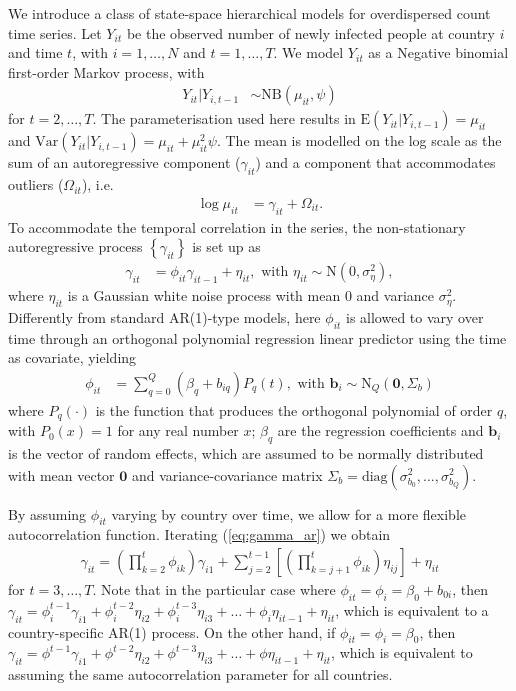 \documentclass[fleqn,10pt]{wlscirep}
\begin{document}
We introduce a class of state-space hierarchical models for overdispersed count time series. Let $Y_{it}$ be the observed number of newly infected people at country $i$ and time $t$, with $i=1,\ldots,N$ and $t=1,\ldots,T$. We model $Y_{it}$ as a Negative binomial first-order Markov process, with
\begin{align*}
    Y_{it}|Y_{i,t-1} &\sim \mbox{NB}(\mu_{it},\psi)
\end{align*}
for $t=2,\ldots,T$. The parameterisation used here results in $\mbox{E}(Y_{it}|Y_{i,t-1})=\mu_{it}$ and $\mbox{Var}(Y_{it}|Y_{i,t-1})=\mu_{it}+\mu_{it}^2\psi$. The mean is modelled on the log scale as the sum of an autoregressive component ($\gamma_{it}$) and a component that accommodates outliers ($\Omega_{it}$), i.e.
\begin{align*}
    \log\mu_{it} &= \gamma_{it}+\Omega_{it}.
\end{align*}
To accommodate the temporal correlation in the series, the non-stationary autoregressive process $\left\lbrace \gamma_{it} \right\rbrace$ is set up as 
\begin{align}
    \gamma_{it} &= \phi_{it}\gamma_{it-1} + \eta_{it}, \mbox{ with } \eta_{it} \sim \mathrm{N}\left(0,\sigma^2_{\eta}\right),
    \label{eq:gamma_ar}
\end{align}
where $\eta_{it}$ is a Gaussian white noise process with mean $0$ and variance $\sigma_{\eta}^2$. Differently from standard AR(1)-type models, here $\phi_{it}$ is allowed to vary over time through an orthogonal polynomial regression linear predictor using the time as covariate, yielding
\begin{align}
    \phi_{it} &= \displaystyle \sum_{q=0}^{Q} (\beta_{q}+b_{iq})P_{q}(t), \mbox{ with } \bm{b}_{i} \sim \mathrm{N}_Q\left(\mathbf{0}, \Sigma_b\right)
    \label{eq:phi}
\end{align}
where $P_q(\cdot)$ is the function that produces the orthogonal polynomial of order $q$, with $P_0(x)=1$ for any real number $x$; $\beta_q$ are the regression coefficients and $\bm{b}_{i}$ is the vector of random effects, which are assumed to be normally distributed with mean vector $\mathbf{0}$ and variance-covariance matrix $\Sigma_b=\mathrm{diag}\left({\sigma^2_{b_0},\ldots,\sigma^2_{b_Q}}\right)$.

By assuming $\phi_{it}$ varying by country over time, we allow for a more flexible autocorrelation function. Iterating (\ref{eq:gamma_ar}) we obtain
\begin{align*}
    \displaystyle\gamma_{it} = \left(\prod_{k=2}^t\phi_{ik}\right)\gamma_{i1}+\sum_{j=2}^{t-1}\left[\left(\prod_{k=j+1}^t\phi_{ik}\right)\eta_{ij}\right]+\eta_{it}
\end{align*}
for $t = 3,\ldots,T$. Note that in the particular case where $\phi_{it}=\phi_{i}=\beta_{0}+b_{0i}$, then $\gamma_{it}= \phi_{i}^{t-1}\gamma_{i1}+\phi_{i}^{t-2}\eta_{i2}+\phi_{i}^{t-3}\eta_{i3}+ \ldots + \phi_{i}\eta_{it-1}+\eta_{it}$, which is equivalent to a country-specific AR(1) process. On the other hand, if $\phi_{it}=\phi_{i}=\beta_{0}$, then $\gamma_{it}= \phi^{t-1}\gamma_{i1}+\phi^{t-2}\eta_{i2}+\phi^{t-3}\eta_{i3}+ \ldots + \phi\eta_{it-1}+\eta_{it}$, which is equivalent to assuming the same autocorrelation parameter for all countries.
\end{document}
